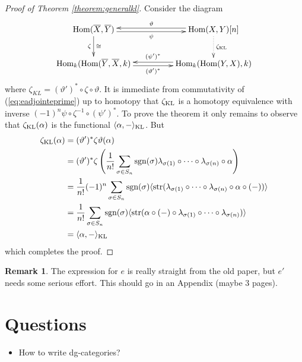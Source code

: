 \documentclass{compositio}
\theoremstyle{definition}
\newtheorem{remark}[theorem]{Remark}
\numberwithin{equation}{section}
\def\Hom{\operatorname{Hom}}
\DeclareMathOperator{\str}{str}
\begin{document}
\begin{proof}[Proof of Theorem \ref{theorem:generalkl}] Consider the diagram
\[
\xymatrix@C+2pc{
\Hom(\overline{X},\overline{Y}) \ar[d]_-{\zeta}^-{\cong} \ar@<-0.5ex>[r]_-{\psi} & \Hom(X,Y)[n] \ar@<-0.5ex>[l]_-{\vartheta} \ar@{.>}[d]^{\zeta_{\textup{KL}}}\\
\Hom_k(\Hom(\overline{Y}, \overline{X},k) \ar@<-0.5ex>[r]_-{(\vartheta')^*} & \Hom_k( \Hom(Y,X), k) \ar@<-0.5ex>[l]_-{(\psi')^*}
}
\]
where $\zeta_{KL} = (\vartheta')^* \circ \zeta \circ \vartheta$. It is immediate from commutativity of (\ref{eq:eadjointeprime}) up to homotopy that $\zeta_{\textup{KL}}$ is a homotopy equivalence with inverse $(-1)^n \psi \circ \zeta^{-1} \circ (\psi')^*$. To prove the theorem it only remains to observe that $\zeta_{\textup{KL}}(\alpha)$ is the functional $\langle \alpha, - \rangle_{\textup{KL}}$. But
\begin{align*}
\zeta_{\textup{KL}}(\alpha) &= (\vartheta')^* \zeta \vartheta( \alpha )\\
&= (\vartheta')^* \zeta\left( \frac{1}{n!} \sum_{\sigma \in S_n} \textup{sgn}(\sigma) \lambda_{\sigma(1)} \circ \cdots \circ \lambda_{\sigma(n)} \circ \alpha \right)\\
&= \frac{1}{n!} (-1)^n \sum_{\sigma \in S_n} \textup{sgn}(\sigma) \langle \str( \lambda_{\sigma(1)} \circ \cdots \circ \lambda_{\sigma(n)} \circ \alpha \circ (-) ) \rangle\\
&= \frac{1}{n!} \sum_{\sigma \in S_n} \textup{sgn}(\sigma) \langle \str(  \alpha \circ (-) \circ \lambda_{\sigma(1)} \circ \cdots \circ \lambda_{\sigma(n)} ) \rangle\\
&= \langle \alpha, - \rangle_{\textup{KL}}
\end{align*}
which completes the proof.
\end{proof}

\begin{remark} The expression for $e$ is really straight from the old paper, but $e'$ needs some serious effort. This should go in an Appendix (maybe $3$ pages).
\end{remark}

\newpage

\section{Questions}

\begin{itemize}
\item How to write dg-categories?
\end{itemize}
\end{document}
